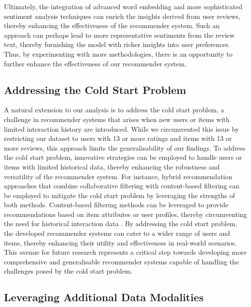 Ultimately, the integration of advanced word embedding and more sophisticated sentiment analysis techniques can enrich the insights derived from user reviews, thereby enhancing the effectiveness of the recommender system. Such an approach can perhaps lead to more representative sentiments from the review text, thereby furnishing the model with richer insights into user preferences. Thus, by experimenting with more methodologies, there is an opportunity to further enhance the effectiveness of our recommender system.



\subsection{Addressing the Cold Start Problem}
\label{subsec:6 Addressing the Cold Start Problem}

A natural extension to our analysis is to address the cold start problem, a challenge in recommender systems that arises when new users or items with limited interaction history are introduced. While we circumvented this issue by restricting our dataset to users with 13 or more ratings and items with 13 or more reviews, this approach limits the generalisability of our findings. To address the cold start problem, innovative strategies can be employed to handle users or items with limited historical data, thereby enhancing the robustness and versatility of the recommender system. For instance, hybrid recommendation approaches that combine collaborative filtering with content-based filtering can be employed to mitigate the cold start problem by leveraging the strengths of both methods. Content-based filtering methods can be leveraged to provide recommendations based on item attributes or user profiles, thereby circumventing the need for historical interaction data \cite{claypool1999combing}. By addressing the cold start problem, the developed recommender systems can cater to a wider range of users and items, thereby enhancing their utility and effectiveness in real-world scenarios. This avenue for future research represents a critical step towards developing more comprehensive and generalisable recommender systems capable of handling the challenges posed by the cold start problem.

\subsection{Leveraging Additional Data Modalities}
\label{subsec:6 Leveraging Additional Data Modalities}

